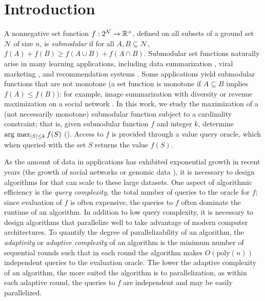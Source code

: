 \section{Introduction} \label{sec:intro}
A nonnegative set function $f:2^{\mathcal N} \to \mathbb{R}^+$, defined on all subsets
of a ground set $\mathcal N$ of size $n$,
is \emph{submodular}
if for all $A, B \subseteq \mathcal N$,
$f(A) + f(B) \ge f(A \cup B) + f( A \cap B )$.
Submodular set functions naturally arise in
many learning applications, 
including data summarization \cite{Simon2007,Sipos2012,Tschiatschek2014,Libbrecht2017}, viral
marketing \cite{Kempe2003,Hartline2008}, and recommendation systems \cite{El-Arini2011}. 
Some applications yield submodular functions
that are not monotone (a set function is monotone if $A \subseteq B$ implies
$f(A) \le f(B)$): for example, image summarization with
diversity \cite{Mirzasoleiman2016} or revenue maximization on
a social network \cite{Hartline2008}.
In this work, we study the maximization of
a (not necessarily monotone) submodular function subject to a cardinality constraint;
that is, given submodular function $f$ and integer $k$, determine
$\arg\, \max_{|S| \le k} f(S)$ (\sm). Access to $f$
is provided through a value query oracle, which
when queried with the set $S$ returns the value $f(S)$.

As the amount of data in applications has exhibited
exponential growth in recent years 
(\eg the growth of social networks \cite{Mislove2008}
or genomic data \cite{Libbrecht2017}), it is 
necessary to design algorithms for \sm that can scale to
these large datasets. 
One aspect of algorithmic efficiency is the \emph{query complexity},
the total number
of queries to the oracle for $f$; since evaluation of $f$
is often expensive, the queries to $f$ often dominate the
runtime of an algorithm. In addition to low query complexity,
it is necessary to
design algorithms that parallelize well  to take advantage of
modern computer architectures. To quantify the degree
of parallelizability of an algorithm,
the \emph{adaptivity} or \emph{adaptive complexity} of an algorithm
is the minimum number of sequential rounds such that
in each round the algorithm makes $O(\text{poly}(n))$
independent queries to the evaluation oracle.
The lower the adaptive complexity of an algorithm,
the more suited the algorithm is to parallelization,
as within each adaptive round, the queries to $f$
are independent and may be easily parallelized. 

